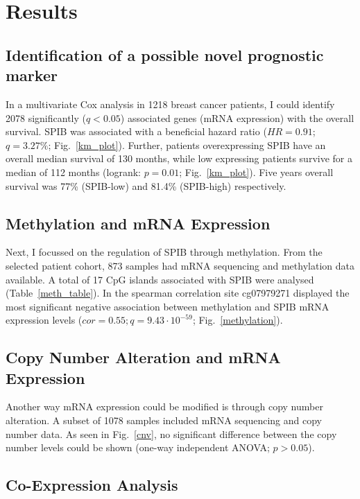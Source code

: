 \section{Results}
\countem

\subsection{Identification of a possible novel prognostic marker}

In a multivariate Cox analysis in 1218 breast cancer patients, I could identify 2078 significantly ($q < 0.05$) associated genes (mRNA expression) with the overall survival.
SPIB was associated with a beneficial hazard ratio ($HR = 0.91$; $q = 3.27\%$; Fig.~\ref{km_plot}).
Further, patients overexpressing SPIB have an overall median survival of 130 months, while low expressing patients survive for a median of 112 months (logrank: $p = 0.01$; Fig.~\ref{km_plot}).
Five years overall survival was 77\% (SPIB-low) and 81.4\% (SPIB-high) respectively. 

\subsection{Methylation and mRNA Expression}

Next, I focussed on the regulation of SPIB through methylation.
From the selected patient cohort, 873 samples had mRNA sequencing and methylation data available.  
A total of 17 CpG islands associated with SPIB were analysed (Table~\ref{meth_table}).
In the spearman correlation site cg07979271 displayed the most significant negative association between methylation and SPIB mRNA expression levels ($cor = 0.55; q = 9.43 \cdot 10^{-59}$; Fig.~\ref{methylation}).

\subsection{Copy Number Alteration and mRNA Expression}

Another way mRNA expression could be modified is through copy number alteration.
A subset of 1078 samples included mRNA sequencing and copy number data.
As seen in Fig.~\ref{cnv}, no significant difference between the copy number levels could be shown (one-way independent ANOVA; $p > 0.05$).

\subsection{Co-Expression Analysis}

